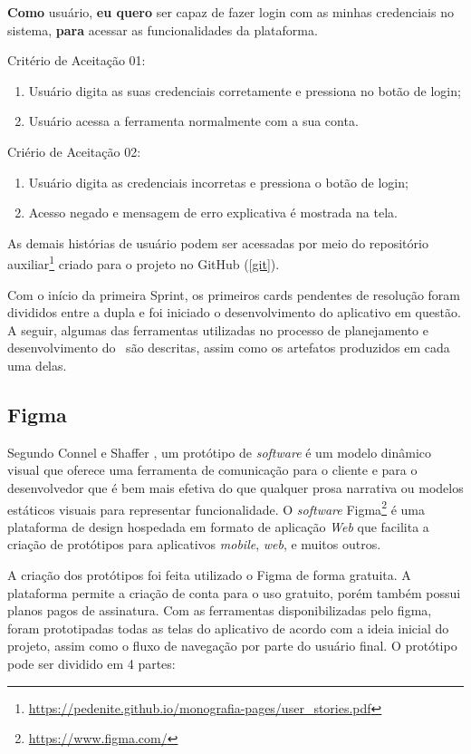 \textbf{Como} usuário, 
\textbf{eu quero} ser capaz de fazer login com as minhas credenciais no sistema, 
\textbf{para} acessar as funcionalidades da plataforma.

Critério de Aceitação 01:
\begin{enumerate}
    \item Usuário digita as suas credenciais corretamente e pressiona no botão de login;
    \item Usuário acessa a ferramenta normalmente com a sua conta.
\end{enumerate}

Criério de Aceitação 02:
\begin{enumerate}
    \item Usuário digita as credenciais incorretas e pressiona o botão de login;
    \item Acesso negado e mensagem de erro explicativa é mostrada na tela.
\end{enumerate}

As demais histórias de usuário podem ser acessadas por meio do repositório auxiliar\footnote{\url{https://pedenite.github.io/monografia-pages/user_stories.pdf}} criado para o projeto no GitHub (\ref{git}).

Com o início da primeira Sprint, os primeiros cards pendentes de resolução foram divididos entre a dupla e foi iniciado o desenvolvimento do aplicativo em questão. A seguir, algumas das ferramentas utilizadas no processo de planejamento e desenvolvimento do \appName\ são descritas, assim como os artefatos produzidos em cada uma delas.

\subsection{Figma}
\label{figma}

Segundo Connel e Shaffer \cite{prototyping}, um protótipo de \textit{software} é um modelo dinâmico visual que oferece uma ferramenta de comunicação para o cliente e para o desenvolvedor que é bem mais efetiva do que qualquer prosa narrativa ou modelos estáticos visuais para representar funcionalidade. O \textit{software} Figma\footnote{\url{https://www.figma.com/}} é uma plataforma de design hospedada em formato de aplicação \textit{Web} que facilita a criação de protótipos para aplicativos \textit{mobile}, \textit{web}, e muitos outros.

A criação dos protótipos foi feita utilizado o Figma de forma gratuita. A plataforma permite a criação de conta para o uso gratuito, porém também possui planos pagos de assinatura. Com as ferramentas disponibilizadas pelo figma, foram prototipadas todas as telas do aplicativo de acordo com a ideia inicial do projeto, assim como o fluxo de navegação por parte do usuário final. O protótipo pode ser dividido em 4 partes:

